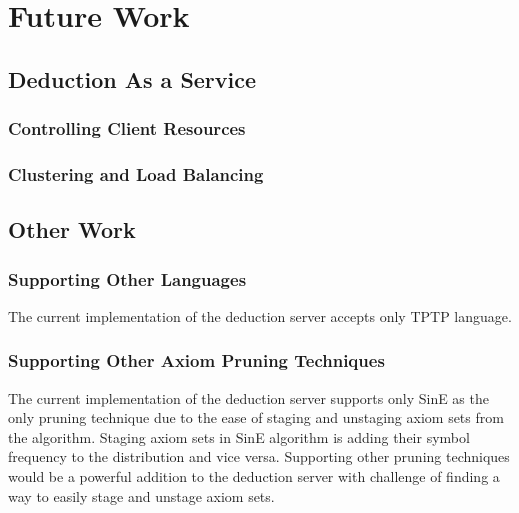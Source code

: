 \chapter{Future Work}
\label{chap:todo}

\section{Deduction As a Service}
\subsection{Controlling Client Resources}
\subsection{Clustering and Load Balancing}

\section{Other Work}
\subsection{Supporting Other Languages}
The current implementation of the deduction server accepts only TPTP language.
\subsection{Supporting Other Axiom Pruning Techniques}
The current implementation of the deduction server supports only SinE as the only pruning technique due to the ease of staging and unstaging axiom sets from the algorithm. Staging axiom sets in SinE algorithm is adding their symbol frequency to the distribution and vice versa. Supporting other pruning techniques would be a powerful addition to the deduction server with challenge of finding a way to easily stage and unstage axiom sets.

